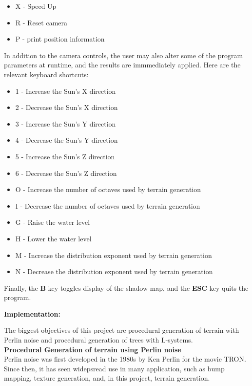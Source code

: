 \documentclass{article}
\begin{document}
\begin{description}
\begin{itemize}
			\item X - Speed Up
			\item R - Reset camera
			\item P - print position information
		\end{itemize}
		In addition to the camera controls, the user may also alter some of the program parameters at runtime, and the results are immmediately applied. Here are the relevant keyboard shortcuts:
		\begin{itemize}
			\item 1 - Increase the Sun's X direction
			\item 2 - Decrease the Sun's X direction
			\item 3 - Increase the Sun's Y direction
			\item 4 - Decrease the Sun's Y direction
			\item 5 - Increase the Sun's Z direction
			\item 6 - Decrease the Sun's Z direction
			\item O - Increase the number of octaves used by terrain generation
			\item I - Decrease the number of octaves used by terrain generation
			\item G - Raise the water level
			\item H - Lower the water level
			\item M - Increase the distribution exponent used by terrain generation
			\item N - Decrease the distribution exponent used by terrain generation
		\end{itemize}
		Finally, the \textbf{B} key toggles display of the shadow map, and the \textbf{ESC} key quits the program.
	\end{description}

\newpage

\Large\noindent\textbf{Implementation:}\\
\normalsize

	The biggest objectives of this project are procedural generation of terrain with Perlin noise and procedural generation of trees with L-systems.
	\\

	\large\noindent\textbf{Procedural Generation of terrain using Perlin noise}
	\normalsize
	\\

	Perlin noise was first developed in the 1980s by Ken Perlin for the movie TRON. Since then, it has seen widepsread use in many application, such as bump mapping, texture generation, and, in this project, terrain generation.
	\\
\end{document}
